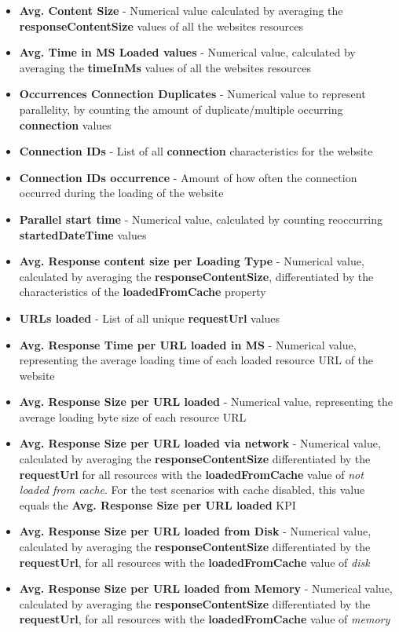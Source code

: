 \begin{itemize}
	\item \textbf{Avg. Content Size} - Numerical value calculated by averaging the \textbf{responseContentSize} values of all the websites resources
	\item \textbf{Avg. Time in MS Loaded values} - Numerical value, calculated by averaging the \textbf{timeInMs} values of all the websites resources
	\item \textbf{Occurrences Connection Duplicates} - Numerical value to represent parallelity, by counting the amount of duplicate/multiple occurring \textbf{connection} values
	\item \textbf{Connection IDs} - List of all \textbf{connection} characteristics for the website 
	\item \textbf{Connection IDs occurrence} - Amount of how often the connection occurred during the loading of the website
	\item \textbf{Parallel start time} - Numerical value, calculated by counting reoccurring \textbf{startedDateTime} values
	\item \textbf{Avg. Response content size per Loading Type} - Numerical value, calculated by averaging the \textbf{responseContentSize}, differentiated by the characteristics of the \textbf{loadedFromCache} property
	\item \textbf{URLs loaded} - List of all unique \textbf{requestUrl} values
	\item \textbf{Avg. Response Time per URL loaded in MS} - Numerical value, representing the average loading time of each loaded resource URL of the website
	\item \textbf{Avg. Response Size per URL loaded} - Numerical value, representing the average loading byte size of each resource URL
	\item \textbf{Avg. Response Size per URL loaded via network} - Numerical value, calculated by averaging the \textbf{responseContentSize} differentiated by the \textbf{requestUrl} for all resources with the \textbf{loadedFromCache} value of \textit{not loaded from cache}. For the test scenarios with cache disabled, this value equals the \textbf{Avg. Response Size per URL loaded} KPI
	\item \textbf{Avg. Response Size per URL loaded from Disk} - Numerical value, calculated by averaging the \textbf{responseContentSize} differentiated by the \textbf{requestUrl}, for all resources with the \textbf{loadedFromCache} value of \textit{disk}
	\item \textbf{Avg. Response Size per URL loaded from Memory} - Numerical value, calculated by averaging the \textbf{responseContentSize} differentiated by the \textbf{requestUrl}, for all resources with the \textbf{loadedFromCache} value of \textit{memory}
\end{itemize}

